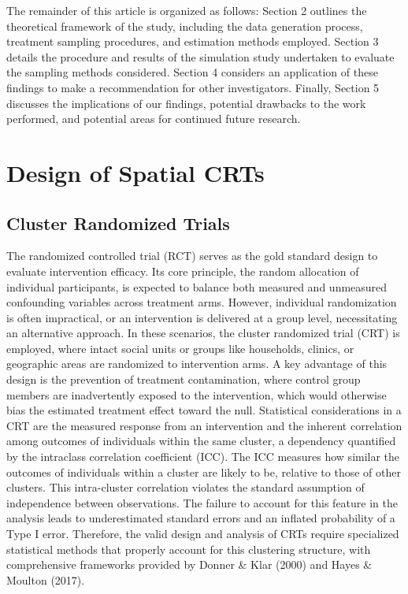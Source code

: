 \documentclass{article}[11pt]
\begin{document}
The remainder of this article is organized as follows: Section 2 outlines the theoretical framework of the study, including the data generation process, treatment sampling procedures, and estimation methods employed. Section 3 details the procedure and results of the simulation study undertaken to evaluate the sampling methods considered. Section 4 considers an application of these findings to make a recommendation for other investigators. Finally, Section 5 discusses the implications of our findings, potential drawbacks to the work performed, and potential areas for continued future research.

\section{Design of Spatial CRTs}

\subsection{Cluster Randomized Trials}

The randomized controlled trial (RCT) serves as the gold standard design to evaluate intervention efficacy\cite{kim_handbook_2021}. Its core principle, the random allocation of individual participants, is expected to balance both measured and unmeasured confounding variables across treatment arms\cite{matthews_introduction_2006}. However, individual randomization is often impractical, or an intervention is delivered at a group level, necessitating an alternative approach\cite{donner_design_2000}\cite{hayes_cluster_2017}. In these scenarios, the cluster randomized trial (CRT) is employed, where intact social units or groups like households, clinics, or geographic areas are randomized to intervention arms\cite{donner_design_2000}\cite{murray_design_1998}. A key advantage of this design is the prevention of treatment contamination, where control group members are inadvertently exposed to the intervention, which would otherwise bias the estimated treatment effect toward the null\cite{hayes_cluster_2017}. Statistical considerations in a CRT are the measured response from an intervention and the inherent correlation among outcomes of individuals within the same cluster, a dependency quantified by the intraclass correlation coefficient (ICC)\cite{donner_design_2000}\cite{hemming_how_2017}. The ICC measures how similar the outcomes of individuals within a cluster are likely to be, relative to those of other clusters. This intra-cluster correlation violates the standard assumption of independence between observations. The failure to account for this feature in the analysis leads to underestimated standard errors and an inflated probability of a Type I error\cite{campbell_how_2014}\cite{ntani_consequences_2021}. Therefore, the valid design and analysis of CRTs require specialized statistical methods that properly account for this clustering structure, with comprehensive frameworks provided by Donner \& Klar (2000)\cite{donner_design_2000} and Hayes \& Moulton (2017)\cite{hayes_cluster_2017}.
\end{document}
